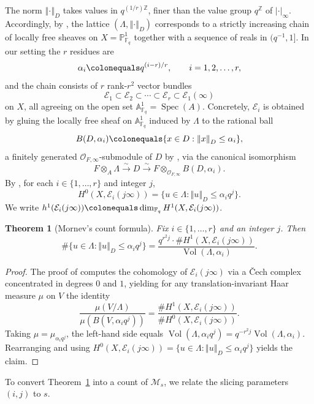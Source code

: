\documentclass[12pt]{amsart}
\newtheorem{thm}{Theorem}[section]
\theoremstyle{definition}
\theoremstyle{remark}
\numberwithin{equation}{section}
\numberwithin{thm}{section}
\DeclareMathOperator{\Spec}{Spec}
\DeclareMathOperator{\Vol}{Vol}
\newcommand{\cE}{\mathcal{E}}
\newcommand{\cM}{\mathcal{M}}
\newcommand{\cO}{\mathcal{O}}
\newcommand{\A}{\mathbb{A}}
\newcommand{\F}{\mathbb{F}}
\newcommand{\PP}{\mathbb{P}}
\newcommand{\Z}{\mathbb{Z}}
\newcommand{\La}{\Lambda}
\newcommand{\norm}[1]{\left\Vert#1\right\Vert}
\newcommand{\abs}[1]{\left|#1\right|}
\begin{document}
	The norm $\norm{\cdot}_D$ takes values in $q^{(1/r)\Z}$, finer than the value group $q^\Z$ of $\abs{\cdot}_\infty$. Accordingly, by \cite[Cor.~1.4.3]{Mornev}, the lattice $(\La, \norm{\cdot}_D)$ corresponds to a strictly increasing chain of locally free sheaves on $X = \PP^1_{\F_q}$ together with a sequence of reals in $(q^{-1}, 1]$. In our setting the $r$ residues are
	\[
	\alpha_i \colonequals q^{(i-r)/r}, \qquad i = 1, 2, \ldots, r,
	\]
	and the chain consists of $r$ rank-$r^2$ vector bundles
	\[
	\cE_1 \subset \cE_2 \subset \cdots \subset \cE_r \subset \cE_1(\infty)
	\]
	on $X$, all agreeing on the open set $\A^1_{\F_q} = \Spec(A)$. Concretely, $\cE_i$ is obtained by gluing the locally free sheaf on $\A^1_{\F_q}$ induced by $\La$ to the rational ball
	\[
	B(D, \alpha_i) \colonequals \{x \in D : \norm{x}_D \leq \alpha_i\},
	\]
	a finitely generated $\cO_{F,\infty}$-submodule of $D$ by \cite[Cor.~1.3.4]{Mornev}, via the canonical isomorphism
	\[
	F \otimes_A \La \xrightarrow{\sim} D \xrightarrow{\sim} F \otimes_{\cO_{F,\infty}} B(D, \alpha_i).
	\]
	By \cite[Thm.~1.4.2(2)]{Mornev}, for each $i \in \{1, \ldots, r\}$ and integer $j$,
	\[
	H^0(X, \cE_i(j\infty)) = \{u \in \La : \norm{u}_D \leq \alpha_i q^j\}.
	\]
	We write $h^1(\cE_i(j\infty)) \colonequals \dim_{\F_q} H^1(X, \cE_i(j\infty))$.
	
	\begin{thm}[Mornev's count formula]\label{thm:mornev-count}
		Fix $i \in \{1, \ldots, r\}$ and an integer $j$. Then
		\[
		\#\{u \in \La : \norm{u}_D \leq \alpha_i q^j\} = \frac{q^{r^2 j}\cdot \#H^1(X, \cE_i(j\infty))}{\Vol(\La, \alpha_i)}.
		\]
	\end{thm}
	
	\begin{proof}
		The proof of \cite[Thm.~1.5.4]{Mornev} computes the cohomology of $\cE_i(j\infty)$ via a \v{C}ech complex concentrated in degrees $0$ and $1$, yielding for any translation-invariant Haar measure $\mu$ on $V$ the identity
		\[
		\frac{\mu(V/\La)}{\mu(B(V, \alpha_i q^j))} = \frac{\#H^1(X, \cE_i(j\infty))}{\#H^0(X, \cE_i(j\infty))}.
		\]
		Taking $\mu = \mu_{\alpha_i q^j}$, the left-hand side equals $\Vol(\La, \alpha_i q^j) = q^{-r^2 j}\Vol(\La, \alpha_i)$. Rearranging and using $H^0(X, \cE_i(j\infty)) = \{u \in \La : \norm{u}_D \leq \alpha_i q^j\}$ yields the claim.
	\end{proof}
	
	To convert Theorem~\ref{thm:mornev-count} into a count of $\cM_s$, we relate the slicing parameters $(i, j)$ to $s$.
	
\end{document}
